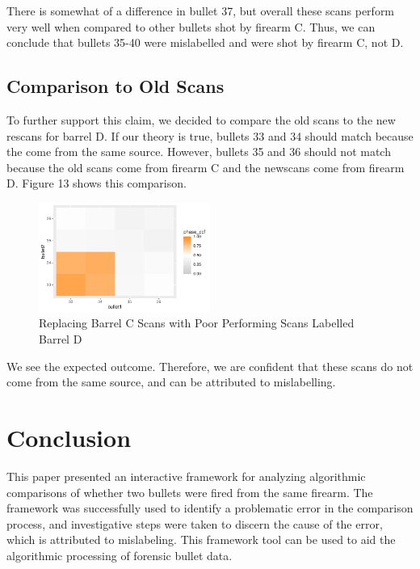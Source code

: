 \documentclass[
  number]{elsarticle}
\begin{document}
There is somewhat of a difference in bullet 37, but overall these scans
perform very well when compared to other bullets shot by firearm C.
Thus, we can conclude that bullets 35-40 were mislabelled and were shot
by firearm C, not D.

\hypertarget{comparison-to-old-scans}{%
\subsection{Comparison to Old Scans}\label{comparison-to-old-scans}}

To further support this claim, we decided to compare the old scans to
the new rescans for barrel D. If our theory is true, bullets 33 and 34
should match because the come from the same source. However, bullets 35
and 36 should not match because the old scans come from firearm C and
the newscans come from firearm D. Figure 13 shows this comparison.

\begin{figure}[H]

{\centering \includegraphics[width=0.5\textwidth,height=0.5\textheight]{Interactive-Visualization-Framework_files/figure-pdf/unnamed-chunk-10-1.pdf}

}

\caption{Replacing Barrel C Scans with Poor Performing Scans Labelled
Barrel D}

\end{figure}

We see the expected outcome. Therefore, we are confident that these
scans do not come from the same source, and can be attributed to
mislabelling.

\hypertarget{conclusion}{%
\section{Conclusion}\label{conclusion}}

This paper presented an interactive framework for analyzing algorithmic
comparisons of whether two bullets were fired from the same firearm. The
framework was successfully used to identify a problematic error in the
comparison process, and investigative steps were taken to discern the
cause of the error, which is attributed to mislabeling. This framework
tool can be used to aid the algorithmic processing of forensic bullet
data.
\end{document}
